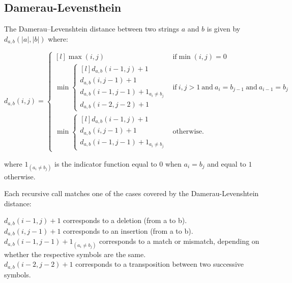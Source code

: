 \subsection{Damerau-Levensthein}

\begin{comment}
  Damerau-Levensthein for clinamen!
  \url{https://en.wikipedia.org/wiki/Damerau%E2%80%93Levenshtein_distance}
\end{comment}

The Damerau–Levenshtein distance between two strings $a$ and $b$ is given by $d_{a,b}(|a|,|b|)$ where:

\begin{equation}
  d_{a,b}(i,j)=\left\{\begin{matrix*}[l]%
  \max(i,j) & \textrm{if}\min(i,j)=0\\
  \min\left\{\begin{matrix*}[l]%
  d_{a,b}(i-1,j)+1\\
  d_{a,b}(i,j-1)+1\\
  d_{a,b}(i-1,j-1)+1_{a_i\neq b_j}\\
  d_{a,b}(i-2,j-2)+1
  \end{matrix*}\right. & \textrm{if}\ i,j > 1 \ \textrm{and}\ a_i = b_{j-1}\ \textrm{and}\ a_{i-1} = b_j\\
  \min\left\{\begin{matrix*}[l]%
  d_{a,b}(i-1,j)+1\\
  d_{a,b}(i,j-1)+1\\
  d_{a,b}(i-1,j-1)+1_{a_i\neq b_j}
\end{matrix*}\right. & \textrm{otherwise.}
  \end{matrix*}\right.
  \label{eq:DL}
\end{equation}

where $1_{(a_i \neq b_j)}$ is the indicator function equal to $0$ when $a_i = b_j$ and equal to $1$ otherwise.

Each recursive call matches one of the cases covered by the Dame\-rau-Leven\-shtein distance:

$d_{a,b}(i-1,j) + 1$ corresponds to a deletion (from a to b).\\
$d_{a,b}(i,j-1) + 1$ corresponds to an insertion (from a to b).\\
$d_{a,b}(i-1,j-1) + 1_{(a_i \neq b_j)}$  corresponds to a match or mismatch, depending on whether the respective symbols are the same.\\
$d_{a,b}(i-2,j-2) + 1$  corresponds to a transposition between two successive symbols.





